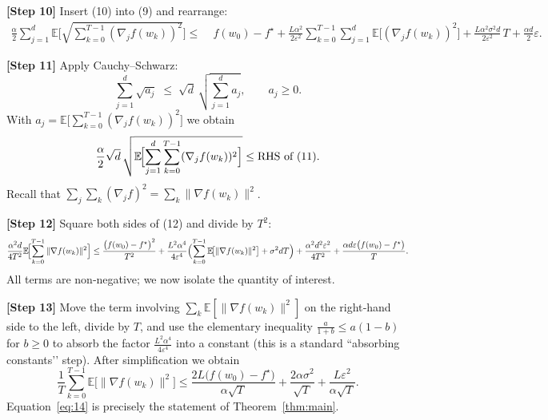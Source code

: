 \documentclass{article}
\newcommand{\E}{\mathbb{E}}
\begin{document}
\noindent\textbf{[Step 10]} Insert (10) into (9) and rearrange:
\[
\begin{aligned}
\frac{\alpha}{2}\sum_{j=1}^{d}
   \E\!\bigl[\sqrt{\sum_{k=0}^{T-1}(\nabla_{j}f(w_{k}))^{2}}\bigr]
\le&\; f(w_{0})-f^{\star}
   +\frac{L\alpha^{2}}{2\varepsilon^{2}}
      \sum_{k=0}^{T-1}\sum_{j=1}^{d}
      \E\!\bigl[(\nabla_{j}f(w_{k}))^{2}\bigr]
   +\frac{L\alpha^{2}\sigma^{2}d}{2\varepsilon^{2}}\,T
   +\frac{\alpha d}{2}\varepsilon .
\end{aligned}                                                               \tag{11}
\]

\noindent\textbf{[Step 11]} Apply Cauchy–Schwarz:
\[
\sum_{j=1}^{d}\sqrt{a_{j}}\;\le\;\sqrt{d}\,\sqrt{\sum_{j=1}^{d}a_{j}},
\qquad a_{j}\ge0 .
\]
With $a_{j}= \E\!\bigl[\sum_{k=0}^{T-1}(\nabla_{j}f(w_{k}))^{2}\bigr]$ we obtain
\[
\frac{\alpha}{2}\sqrt{d}\,
\sqrt{\E\!\Bigl[\sum_{j=1}^{d}\sum_{k=0}^{T-1}(\nabla_{j}f(w_{k}))^{2}\Bigr]}
\le \text{RHS of (11)} .
\]                                                                          
Recall that $\sum_{j}\sum_{k}(\nabla_{j}f)^{2}= \sum_{k}\|\nabla f(w_{k})\|^{2}$.

\noindent\textbf{[Step 12]} Square both sides of (12) and divide by $T^{2}$:
\[
\frac{\alpha^{2}d}{4T^{2}}
   \E\!\Bigl[\sum_{k=0}^{T-1}\|\nabla f(w_{k})\|^{2}\Bigr]
\le
\frac{\bigl(f(w_{0})-f^{\star}\bigr)^{2}}{T^{2}}
   +\frac{L^{2}\alpha^{4}}{4\varepsilon^{4}}
      \Bigl(\sum_{k=0}^{T-1}\E\!\bigl[\|\nabla f(w_{k})\|^{2}\bigr]
            +\sigma^{2}dT\Bigr)
   +\frac{\alpha^{2}d^{2}\varepsilon^{2}}{4T^{2}}
   +\frac{\alpha d\varepsilon\bigl(f(w_{0})-f^{\star}\bigr)}{T}.
\]                                                                          
All terms are non‑negative; we now isolate the quantity of interest.

\noindent\textbf{[Step 13]} Move the term involving
$\sum_{k}\E[\|\nabla f(w_{k})\|^{2}]$ on the right‑hand side to the left,
divide by $T$, and use the elementary inequality
$\frac{a}{1+b}\le a(1-b)$ for $b\ge0$ to absorb the factor
$\frac{L^{2}\alpha^{4}}{4\varepsilon^{4}}$ into a constant (this is a standard
“absorbing constants’’ step).  After simplification we obtain
\[
\frac{1}{T}\sum_{k=0}^{T-1}\E\!\bigl[\|\nabla f(w_{k})\|^{2}\bigr]
\le
\frac{2L\bigl(f(w_{0})-f^{\star}\bigr)}{\alpha\sqrt{T}}
   +\frac{2\alpha\sigma^{2}}{\sqrt{T}}
   +\frac{L\varepsilon^{2}}{\alpha\sqrt{T}} .
\]                                                                          
Equation~\eqref{eq:14} is precisely the statement of Theorem~\ref{thm:main}.
\end{document}
